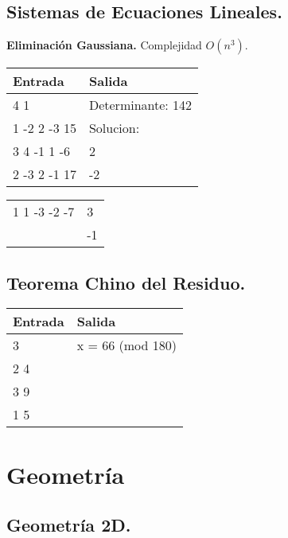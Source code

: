 \documentclass[10pt, letterpaper, twoside]{article}
\begin{document}
\subsection{Sistemas de Ecuaciones Lineales.}

\textbf{Eliminación Gaussiana.} Complejidad $O(n^3)$.



\begin{tabular}{|p{7cm}|p{7cm}|}
\hline
\textbf{Entrada} & \textbf{Salida}\\ \hline
4 1          & Determinante: 142\\
1 -2 2 -3 15 & Solucion:\\ 
3 4 -1 1 -6  & 2\\ 
2 -3 2 -1 17 & -2\\ 
\end{tabular}

\begin{tabular}{|p{7cm}|p{7cm}|}
1 1 -3 -2 -7 & 3\\ 
             & -1\\ \hline
\end{tabular}\bigskip

\subsection{Teorema Chino del Residuo.}



\begin{tabular}{|p{7cm}|p{7cm}|}
\hline
\textbf{Entrada} & \textbf{Salida}\\ \hline
3   & x = 66 (mod 180)\\
2 4 & \\ 
3 9 & \\ 
1 5 & \\ \hline
\end{tabular}\bigskip


\section{Geometría}

\subsection{Geometría 2D.}
\end{document}
